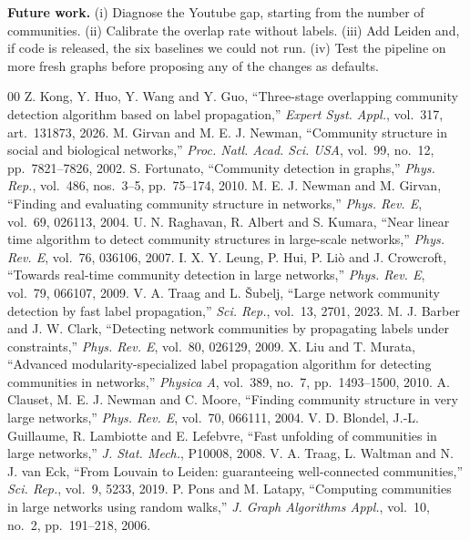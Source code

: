 \documentclass[conference]{IEEEtran}
\begin{document}
\textbf{Future work.} (i) Diagnose the Youtube gap, starting from the number of communities. (ii) Calibrate the overlap rate without labels. (iii) Add Leiden and, if code is released, the six baselines we could not run. (iv) Test the pipeline on more fresh graphs before proposing any of the changes as defaults.

\begin{thebibliography}{00}
 Z. Kong, Y. Huo, Y. Wang and Y. Guo, ``Three-stage overlapping community detection algorithm based on label propagation,'' \emph{Expert Syst. Appl.}, vol.~317, art.~131873, 2026.
 M. Girvan and M. E. J. Newman, ``Community structure in social and biological networks,'' \emph{Proc. Natl. Acad. Sci. USA}, vol.~99, no.~12, pp.~7821--7826, 2002.
 S. Fortunato, ``Community detection in graphs,'' \emph{Phys. Rep.}, vol.~486, nos.~3--5, pp.~75--174, 2010.
 M. E. J. Newman and M. Girvan, ``Finding and evaluating community structure in networks,'' \emph{Phys. Rev. E}, vol.~69, 026113, 2004.
 U. N. Raghavan, R. Albert and S. Kumara, ``Near linear time algorithm to detect community structures in large-scale networks,'' \emph{Phys. Rev. E}, vol.~76, 036106, 2007.
 I. X. Y. Leung, P. Hui, P. Li\`o and J. Crowcroft, ``Towards real-time community detection in large networks,'' \emph{Phys. Rev. E}, vol.~79, 066107, 2009.
 V. A. Traag and L. \v{S}ubelj, ``Large network community detection by fast label propagation,'' \emph{Sci. Rep.}, vol.~13, 2701, 2023.
 M. J. Barber and J. W. Clark, ``Detecting network communities by propagating labels under constraints,'' \emph{Phys. Rev. E}, vol.~80, 026129, 2009.
 X. Liu and T. Murata, ``Advanced modularity-specialized label propagation algorithm for detecting communities in networks,'' \emph{Physica A}, vol.~389, no.~7, pp.~1493--1500, 2010.
 A. Clauset, M. E. J. Newman and C. Moore, ``Finding community structure in very large networks,'' \emph{Phys. Rev. E}, vol.~70, 066111, 2004.
 V. D. Blondel, J.-L. Guillaume, R. Lambiotte and E. Lefebvre, ``Fast unfolding of communities in large networks,'' \emph{J. Stat. Mech.}, P10008, 2008.
 V. A. Traag, L. Waltman and N. J. van Eck, ``From Louvain to Leiden: guaranteeing well-connected communities,'' \emph{Sci. Rep.}, vol.~9, 5233, 2019.
 P. Pons and M. Latapy, ``Computing communities in large networks using random walks,'' \emph{J. Graph Algorithms Appl.}, vol.~10, no.~2, pp.~191--218, 2006.

\end{thebibliography}
\end{document}
